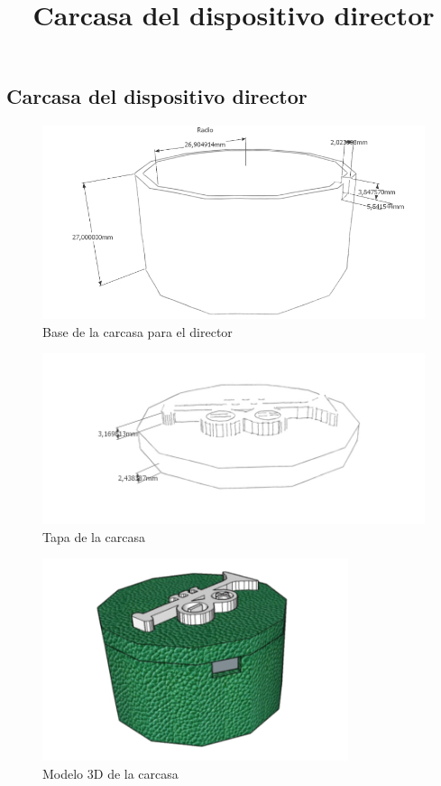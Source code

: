 \clearpage

\subsection{Carcasa del dispositivo director}
\title{Carcasa del dispositivo director}

\begin{figure}[!htb]
\centering
\includegraphics[width=1\textwidth]{./imagenes/carcasa_base_director}
\caption{Base de la carcasa para el director} \label{fig:carcasa_base_director}
\end{figure}

\begin{figure}[!htb]
\centering
\includegraphics[width=1\textwidth]{./imagenes/carcasa_tapa}
\caption{Tapa de la carcasa} \label{fig:carcasa_tapa}
\end{figure}

\begin{figure}[!htb]
\centering
\includegraphics[width=0.8\textwidth]{./imagenes/carcasa_modelo_director}
\caption{Modelo 3D de la carcasa} \label{fig:carcasa_modelo}
\end{figure}


